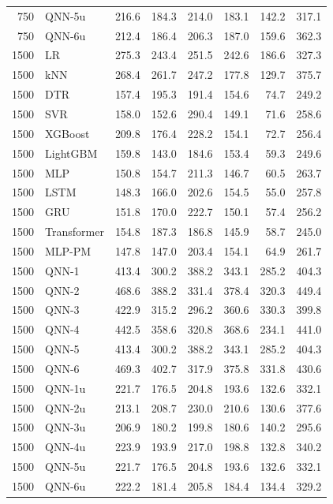 \begin{longtable}{rlrrrrrr}
750 & QNN-5u & 216.6 & 184.3 & 214.0 & 183.1 & 142.2 & 317.1 \\
750 & QNN-6u & 212.4 & 186.4 & 206.3 & 187.0 & 159.6 & 362.3 \\
\midrule
1500 & LR & 275.3 & 243.4 & 251.5 & 242.6 & 186.6 & 327.3 \\
1500 & kNN & 268.4 & 261.7 & 247.2 & 177.8 & 129.7 & 375.7 \\
1500 & DTR & 157.4 & 195.3 & 191.4 & 154.6 & 74.7 & 249.2 \\
1500 & SVR & 158.0 & 152.6 & 290.4 & 149.1 & 71.6 & 258.6 \\
1500 & XGBoost & 209.8 & 176.4 & 228.2 & 154.1 & 72.7 & 256.4 \\
1500 & LightGBM & 159.8 & 143.0 & 184.6 & 153.4 & 59.3 & 249.6 \\
1500 & MLP & 150.8 & 154.7 & 211.3 & 146.7 & 60.5 & 263.7 \\
1500 & LSTM & 148.3 & 166.0 & 202.6 & 154.5 & 55.0 & 257.8 \\
1500 & GRU & 151.8 & 170.0 & 222.7 & 150.1 & 57.4 & 256.2 \\
1500 & Transformer & 154.8 & 187.3 & 186.8 & 145.9 & 58.7 & 245.0 \\
1500 & MLP-PM & 147.8 & 147.0 & 203.4 & 154.1 & 64.9 & 261.7 \\
1500 & QNN-1 & 413.4 & 300.2 & 388.2 & 343.1 & 285.2 & 404.3 \\
1500 & QNN-2 & 468.6 & 388.2 & 331.4 & 378.4 & 320.3 & 449.4 \\
1500 & QNN-3 & 422.9 & 315.2 & 296.2 & 360.6 & 330.3 & 399.8 \\
1500 & QNN-4 & 442.5 & 358.6 & 320.8 & 368.6 & 234.1 & 441.0 \\
1500 & QNN-5 & 413.4 & 300.2 & 388.2 & 343.1 & 285.2 & 404.3 \\
1500 & QNN-6 & 469.3 & 402.7 & 317.9 & 375.8 & 331.8 & 430.6 \\
1500 & QNN-1u & 221.7 & 176.5 & 204.8 & 193.6 & 132.6 & 332.1 \\
1500 & QNN-2u & 213.1 & 208.7 & 230.0 & 210.6 & 130.6 & 377.6 \\
1500 & QNN-3u & 206.9 & 180.2 & 199.8 & 180.6 & 140.2 & 295.6 \\
1500 & QNN-4u & 223.9 & 193.9 & 217.0 & 198.8 & 132.8 & 340.2 \\
1500 & QNN-5u & 221.7 & 176.5 & 204.8 & 193.6 & 132.6 & 332.1 \\
1500 & QNN-6u & 222.2 & 181.4 & 205.8 & 184.4 & 134.4 & 329.2 \\

\end{longtable}
